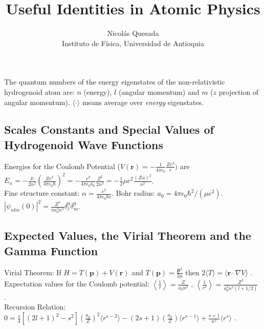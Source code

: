 \documentclass[10.5pt,letterpaper]{article}
\title{Useful Identities in Atomic Physics}
\author{Nicol\'as Quesada\\{\small \sf Instituto de F\'isica, Universidad de Antioquia}}
\date{}
\begin{document}
\maketitle
\thispagestyle{empty}
\noindent The quantum numbers of the energy eigenstates of the non-relativistic hydrogenoid atom are: $n$ (energy), $l$ (angular momentum) and $m$ ($z$ projection of angular momentum). $\langle \cdot \rangle$ means average over \emph{energy} eigenstates.

\subsection*{Scales Constants and Special Values of Hydrogenoid Wave Functions}

Energies for the Coulomb Potential ($V(\textbf{r})=-\frac{1}{4 \pi \epsilon_0}\frac{Z e^2}{r})$ are $E_n=-\frac{\mu}{2n^2}\left( \frac{Ze^2}{4 \pi \epsilon_0 \hbar} \right)^2=-\frac{e^2}{4 \pi \epsilon_0 a_0} \frac{Z^2}{2 n^2}=-\frac{1}{2} \mu c^2 \frac{(Z \alpha)^2}{n ^2}$.\\

\noindent Fine structure constant: $\alpha=\frac{e^2}{4 \pi \epsilon_0 \hbar c}$. Bohr radius: $a_0=4 \pi \epsilon_0 \hbar^2/(\mu e^2)$. \space \space \space
$|\psi_{n l m}(0)|^2=\frac{Z^3}{\pi a_0^3 n^3} \delta_{l}^0 \delta_m^0$.

\subsection*{Expected Values, the Virial Theorem and the Gamma Function}

Virial Theorem: If $H=T(\textbf{p})+V(\textbf{r})$ and $T(\textbf{p})=\frac{\textbf{p}^2}{2\mu}$ then $2\langle T \rangle=\langle \textbf{r} \cdot \nabla V \rangle$ .\\

\noindent Expectation values for the Coulomb potential: $\left\langle \frac{1}{r} \right\rangle=\frac{Z}{a_0 n^2}$ , $\left\langle \frac{1}{r^2} \right\rangle=\frac{Z^2}{a_0^2 n^3 (l+1/2)}$ .\\

\noindent Recursion Relation: $0=\frac{s}{4}\left[(2 l+1)^2-s^2 \right] \left( \frac{a_0}{Z} \right)^2 \langle r^{s-2} \rangle-(2s+1)\left(\frac{a_0}{Z} \right) \langle r^{s-1} \rangle+\frac{s+1}{n^2} \langle r^s \rangle$ .\\
\end{document}
